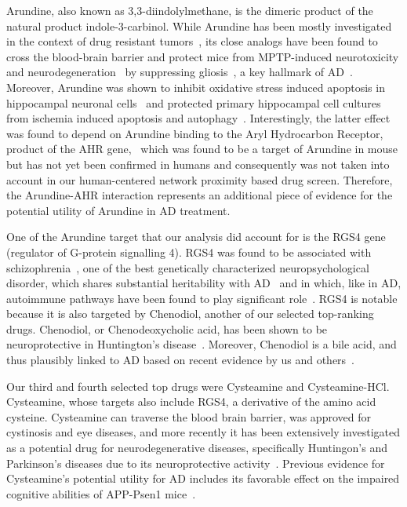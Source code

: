 \documentclass[letterpaper]{article}
\begin{document}
Arundine, also known as 3,3-diindolylmethane, is the dimeric product of the
natural product indole-3-carbinol.  While Arundine has been mostly
investigated in the context of drug resistant tumors~\citep{Biersack2020}, its
close analogs have been found to cross the blood-brain barrier and protect
mice from MPTP-induced neurotoxicity and
neurodegeneration~\citep{DeMiranda2013} by suppressing
gliosis~\citep{DeMiranda2014}, a key hallmark of AD~\citep{DeStrooper2016}.
Moreover, Arundine was shown to inhibit oxidative stress induced apoptosis in
hippocampal neuronal cells~\citep{Lee2019} and protected primary hippocampal
cell cultures from ischemia induced apoptosis and
autophagy~\citep{Rzemieniec2019}.  Interestingly, the latter effect was found
to depend on Arundine binding to the Aryl Hydrocarbon Receptor, product of the
AHR gene,~\citep{Rzemieniec2019} which was found to be a target of Arundine in
mouse but has not yet been confirmed in humans and consequently was not taken
into account in our human-centered network proximity based drug screen.
Therefore, the Arundine-AHR interaction represents an additional piece of
evidence for the potential utility of Arundine in AD treatment.

One of the Arundine target that our analysis did account for is the RGS4 gene
(regulator of G-protein signalling 4). RGS4 was found to be associated with
schizophrenia~\citep{Chowdari2002}, one of the best genetically characterized
neuropsychological disorder, which shares substantial heritability with
AD~\citep{Consortium2018} and in which, like in AD, autoimmune pathways have
been found to play significant role~\citep{Sekar2016a}.  RGS4 is notable
because it is also targeted by Chenodiol, another of our selected top-ranking
drugs.  Chenodiol, or Chenodeoxycholic acid, has been shown to be
neuroprotective in Huntington's disease~\citep{Keene2002}.  Moreover,
Chenodiol is a bile acid, and thus plausibly linked to
AD based on recent evidence by us and others~\citep{Varma2021,Baloni2020}.

Our third and fourth selected top drugs were Cysteamine and Cysteamine-HCl.
Cysteamine, whose targets also include RGS4, a derivative of the amino acid
cysteine.  Cysteamine can traverse the blood brain barrier, was approved for
cystinosis and eye diseases, and more recently it has been extensively
investigated as a potential drug for neurodegenerative diseases, specifically
Huntingon's and Parkinson's diseases due to its neuroprotective
activity~\citep{Besouw2013,Paul2019}.  Previous evidence for Cysteamine's
potential utility for AD includes its favorable effect on the impaired
cognitive abilities of APP-Psen1 mice~\citep{Cicchetti2019}.
\end{document}
